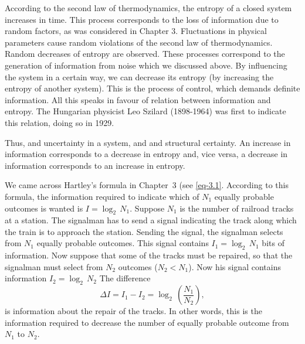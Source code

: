 According to the second law of thermodynamics, the entropy of a closed system increases in time. This process corresponds to the loss of information due to random factors, as was considered in Chapter 3. Fluctuations in physical parameters cause random violations of the second law of thermodynamics. Random decreases of entropy are observed. These processes correspond to the generation of information from noise which we discussed above. By influencing the system in a certain way, we can decrease its entropy (by increasing the entropy of another system). This is the process of control, which demands definite information.
All this speaks in favour of relation between information and entropy. The Hungarian physicist Leo Szilard (1898-1964) was first to indicate this relation, doing so in 1929.

Thus,  and uncertainty in a system, and  and structural certainty. An increase in information corresponds to a decrease in entropy and, vice versa, a decrease in information corresponds to an increase in entropy.

 We came across Hartley's formula in Chapter~3 (see \eqref{eq-3.1}. According to this formula, the information required to indicate which of $N_{1}$ equally probable outcomes is wanted is $I= \log_{2} \, N_{1}$. Suppose $N_{1}$ is the number of railroad tracks at a station. The signalman has to send a signal indicating the track along which the train is to approach the station. Sending the signal, the signalman selects from $N_{1}$ equally probable outcomes. This signal contains  $I_{1} = \log_{2} \, N_{1}$ bits of	information. Now suppose	that	some of the tracks must be repaired, so that the signalman must select from $ N_{2}$ outcomes ($ N_{2} <  N_{1}$). Now his signal contains information $I_{2} = \log_{2} \, N_{2}$ The difference
\begin{equation}%
\Delta I = I_{1}- I_{2} = \log_{2} \, \left( \frac{N_{1}}{N_{2}} \right),
\label{eq-4.60}
\end{equation}
is information about the repair of the tracks. In other words, this is the information required to decrease the number of equally probable outcome	from $N_{1}$ to $ N_{2}$.

